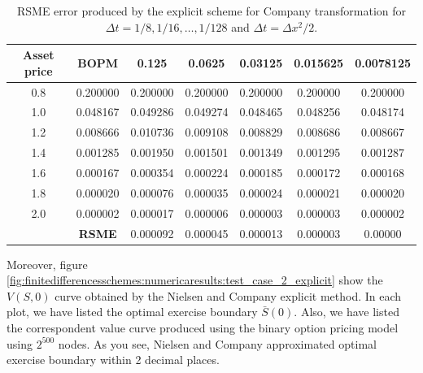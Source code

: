\begin{table}[H]
    \centering
    \begin{tabular}{@{}ccccccc@{}}
    \toprule
    \textbf{Asset price} & \textbf{BOPM} & 0.125    & 0.0625   & 0.03125  & 0.015625 & 0.0078125 \\ \midrule
    0.8                  & 0.200000      & 0.200000 & 0.200000 & 0.200000 & 0.200000 & 0.200000  \\
    1.0                  & 0.048167      & 0.049286 & 0.049274 & 0.048465 & 0.048256 & 0.048174  \\
    1.2                  & 0.008666      & 0.010736 & 0.009108 & 0.008829 & 0.008686 & 0.008667  \\
    1.4                  & 0.001285      & 0.001950 & 0.001501 & 0.001349 & 0.001295 & 0.001287  \\
    1.6                  & 0.000167      & 0.000354 & 0.000224 & 0.000185 & 0.000172 & 0.000168  \\
    1.8                  & 0.000020      & 0.000076 & 0.000035 & 0.000024 & 0.000021 & 0.000020  \\
    2.0                  & 0.000002      & 0.000017 & 0.000006 & 0.000003 & 0.000003 & 0.000002  \\
    & \textbf{RSME} & 0.000092 & 0.000045 & 0.000013 & 0.000003 & 0.00000   \\ \bottomrule
    \end{tabular}
    \caption{\label{tab:rsme_explicit_company_transformation}RSME error produced by the explicit scheme for Company transformation for $\Delta{t}=1/8,1/16,\dots,1/128$ and $\Delta{t}=\Delta{x}^2/2$.}
\end{table}

Moreover, figure \eqref{fig:finitedifferencesschemes:numericaresults:test_case_2_explicit} show the $V(S, 0)$ curve obtained by the Nielsen and Company explicit method. In each plot, we have listed the optimal exercise boundary $\bar{S}(0)$. Also, we have listed the correspondent value curve produced using the binary option pricing model using $2^500$ nodes. As you see, Nielsen and Company approximated optimal exercise boundary within 2 decimal places. 

